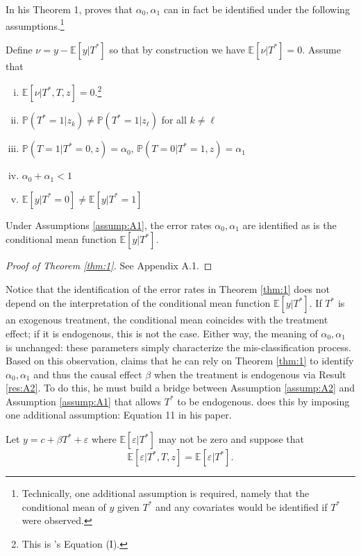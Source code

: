 In his Theorem 1, \cite{Mahajan} proves that $\alpha_0, \alpha_1$ can in fact be identified under the following assumptions.\footnote{Technically, one additional assumption is required, namely that the conditional mean of $y$ given $T^*$ and any covariates would be identified if $T^*$ were observed.}
\begin{assump}[Mahajan A1] Define $\nu = y - \mathbb{E}[y|T^*]$ so that by construction we have $\mathbb{E}[\nu|T^*]=0$. Assume that
  \label{assump:A1}
  \begin{enumerate}[(i)]
    \item $\mathbb{E}[\nu|T^*,T,z] = 0$.\footnote{This is \citeauthor{Mahajan}'s Equation (I).}
    \item $\mathbb{P}(T^*=1|z_k)\neq \mathbb{P}(T^*=1|z_\ell)$ for all $k\neq \ell$
    \item $\mathbb{P}(T = 1| T^* = 0, z) = \alpha_0$,  $\mathbb{P}(T = 0| T^* = 1, z) = \alpha_1$
    \item $\alpha_0 + \alpha_1 < 1$
    \item $\mathbb{E}[y|T^*=0]\neq \mathbb{E}[y|T^*=1]$
  \end{enumerate}
\end{assump}
\begin{thm}
  \label{thm:1}
  Under Assumptions \ref{assump:A1}, the error rates $\alpha_0, \alpha_1$ are identified as is the conditional mean function $\mathbb{E}[y|T^*]$.
\end{thm}
\begin{proof}[Proof of Theorem \ref{thm:1}]
  See \cite{Mahajan} Appendix A.1. 
\end{proof}
Notice that the identification of the error rates in Theorem \ref{thm:1} does not depend on the interpretation of the conditional mean function $\mathbb{E}[y|T^*]$.
If $T^*$ is an exogenous treatment, the conditional mean coincides with the treatment effect; if it is endogenous, this is not the case.
Either way, the meaning of $\alpha_0, \alpha_1$ is unchanged: these parameters simply characterize the mis-classification process. 
Based on this observation, \cite{Mahajan} claims that he can rely on Theorem \ref{thm:1} to identify $\alpha_0,\alpha_1$ and thus the causal effect $\beta$ when the treatment is endogenous via Result \ref{res:A2}.
To do this, he must build a bridge between Assumption \ref{assump:A2} and Assumption \ref{assump:A1} that allows $T^*$ to be endogenous.
\cite{Mahajan} does this by imposing one additional assumption: Equation 11 in his paper.
\begin{assump}
  \label{assump:Eq11}
  Let $y = c + \beta T^* + \varepsilon$ where $\mathbb{E}[\varepsilon|T^*]$ may not be zero and suppose that 
  \[\mathbb{E}[\varepsilon|T^*,T,z] = \mathbb{E}[\varepsilon|T^*].\]
\end{assump}
